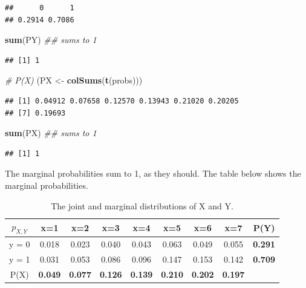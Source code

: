 \documentclass[12pt,]{krantz}
\newenvironment{Shaded}{\begin{snugshade}}{\end{snugshade}}
\newcommand{\CommentTok}[1]{\textcolor[rgb]{0.56,0.35,0.01}{\textit{#1}}}
\newcommand{\KeywordTok}[1]{\textcolor[rgb]{0.13,0.29,0.53}{\textbf{#1}}}
\newcommand{\NormalTok}[1]{#1}
\newcommand{\StringTok}[1]{\textcolor[rgb]{0.31,0.60,0.02}{#1}}
\begin{document}
\begin{verbatim}
##      0      1 
## 0.2914 0.7086
\end{verbatim}

\begin{Shaded}
\begin{Highlighting}[]
\KeywordTok{sum}\NormalTok{(PY)  }\CommentTok{## sums to 1}
\end{Highlighting}
\end{Shaded}

\begin{verbatim}
## [1] 1
\end{verbatim}

\begin{Shaded}
\begin{Highlighting}[]
\CommentTok{# P(X)}
\NormalTok{(PX <-}\StringTok{ }\KeywordTok{colSums}\NormalTok{(}\KeywordTok{t}\NormalTok{(probs)))}
\end{Highlighting}
\end{Shaded}

\begin{verbatim}
## [1] 0.04912 0.07658 0.12570 0.13943 0.21020 0.20205
## [7] 0.19693
\end{verbatim}

\begin{Shaded}
\begin{Highlighting}[]
\KeywordTok{sum}\NormalTok{(PX)  }\CommentTok{## sums to 1}
\end{Highlighting}
\end{Shaded}

\begin{verbatim}
## [1] 1
\end{verbatim}

The marginal probabilities sum to 1, as they should. The table below shows the marginal probabilities.

\small
\begin{table}[!htbp]
\begin{center}
\begin{tabular}{c|ccccccc|c}
$p_{X,Y}$ & x=1 & x=2 & x=3 & x=4 & x=5 & x=6 & x=7 & P(Y)\\
\hline
y = 0 & 0.018 & 0.023 & 0.040 & 0.043 & 0.063 & 0.049 & 0.055 &  \textbf{0.291}\\
y = 1 & 0.031 & 0.053 & 0.086 & 0.096 &  0.147 & 0.153 &  0.142 &  \textbf{0.709}\\
\hline
P(X) & \textbf{0.049} & \textbf{0.077} & \textbf{0.126} & \textbf{0.139} & \textbf{0.210} & \textbf{0.202} & \textbf{0.197}\\
\end{tabular}
\end{center}
\caption{The joint and marginal distributions of X and Y.}\label{discretebivartable2}
\end{table}
\normalsize
\end{document}
